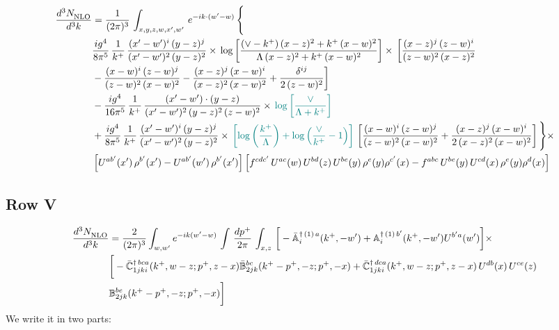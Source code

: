 \documentclass[9pt]{article}
\def\mf#1{\mathbb{#1}}
\numberwithin{equation}{section}
\begin{document}
\begin{align}
    \frac{d^{3}N_{\rm NLO}^{\rm}}{d^{3}k}  & =  \frac{1}{(2\pi)^{3}}\,
    \int_{x,y,z,w,x',w'}\,e^{-ik\cdot (w^\prime-w)}\,\Bigg\{\notag \\ & \frac{ig^{4}}{8\pi^{5}}\,\frac{1}{k^{+}}\,\frac{(x'-w')^{i}\,(y-z)^{j}}{(x'-w')^{2}\,(y-z)^{2}}\times\,\log{\left[\frac{(\vee-k^{+})\,(x-z)^{2}+k^{+}\,(x-w)^{2}}{\Lambda\, (x-z)^{2} + k^{+}\,(x-w)^{2}}\right]}\times\, \bigg[\frac{(x-z)^{j}\,(z-w)^{i}}{(z-w)^{2}\,(x-z)^{2}}\notag \\ & -\frac{(x-w)^{i}\,(z-w)^{j}}{(z-w)^{2}\,(x-w)^{2}}-\frac{(x-z)^{j}\,(x-w)^{i}}{(x-z)^{2}\,(x-w)^{2}}+\frac{\delta^{ij}}{2\,(z-w)^{2}}\bigg]\notag \\ & -\frac{ig^{4}}{16\pi^{5}}\,\frac{1}{k^{+}}\,\frac{(x'-w')\cdot (y-z)}{(x'-w')^{2}\,(y-z)^{2}\,(z-w)^{2}}\times\,{\color{teal}\log{\left[\frac{\vee}{\Lambda + k^{+}}\right]}}\notag \\ & + \frac{ig^{4}}{8\pi^{5}}\,\frac{1}{k^{+}}\,\frac{(x'-w')^{i}\,(y-z)^{j}}{(x'-w')^{2}\,(y-z)^{2}}\times\,{\color{teal}\left[\log{\left(\frac{k^{+}}{\Lambda}\right)}+\log{\left(\frac{\vee}{k^{+}}-1\right)}\right]}\,\left[\frac{(x-w)^{i}\,(z-w)^{j}}{(z-w)^{2}\,(x-w)^{2}}+\frac{(x-z)^{j}\,(x-w)^{i}}{2\, (x-z)^{2}\,(x-w)^{2}}\right] \Bigg\}\times\notag \\ &  \left[U^{ab'}(x')\,\rho^{b'}(x')-U^{ab'}(w')\,\rho^{b'}(x')\right] \left[f^{cdc'}\,U^{ac}(w)\,U^{bd}(z)\,U^{be}(y)\,\rho^{e}(y)\rho^{c'}(x)-f^{abc}\,U^{be}(y)\,U^{cd}(x)\,\rho^{e}(y)\rho^{d}(x)\right]
\end{align}
\subsection{Row V\,}
\begin{align}
    \frac{d^{3}N_{\rm NLO}^{\rm}}{d^{3}k}  & = \frac{2}{(2\pi)^{3}}  \int_{w, w^\prime} e^{-ik(w^\prime-w)}\, \int\, \frac{dp^{+}}{2\pi}\,\int_{x,z}\, \bigg[-\bar{\mf{A}}^{\dagger\,(1)\,a}_{i}(k^{+},-w^{\prime})+\mf{A}^{\dagger\, (1)\, b^{\prime}}_{i}(k^{+},-w^{\prime})U^{b^{\prime}a}(w^{\prime})\bigg]\times\notag \\ & \bigg[-\Bar{\mf{C}}^{\dagger\, bca}_{1jki}(k^{+},w-z;p^{+},z-x)\Bar{\mf{B}}^{bc}_{2jk}(k^{+}-p^{+},- z;p^{+},-x)+\bar{\mf{C}}^{\dagger\, dca}_{1jki}(k^+,w-z; p^+, z-x)\,U^{db}(x)\,U^{ce}(z) \notag \\ & {\mf{B}}^{be}_{2jk} (k^{+}-p^+, -z; p^+, -x) \bigg]\nonumber
\end{align}
We write it in two parts:
\end{document}
